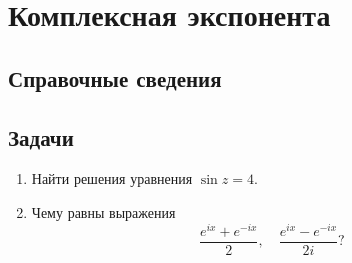 \section{Комплексная экспонента}

\subsection*{Справочные сведения}

\subsection*{Задачи}
\begin{enumerate}
\item Найти решения уравнения $\sin z=4$.
\item Чему равны выражения
$$
\frac{e^{ix}+e^{-ix}}{2},\quad \frac{e^{ix}-e^{-ix}}{2i}?
$$
\end{enumerate}



